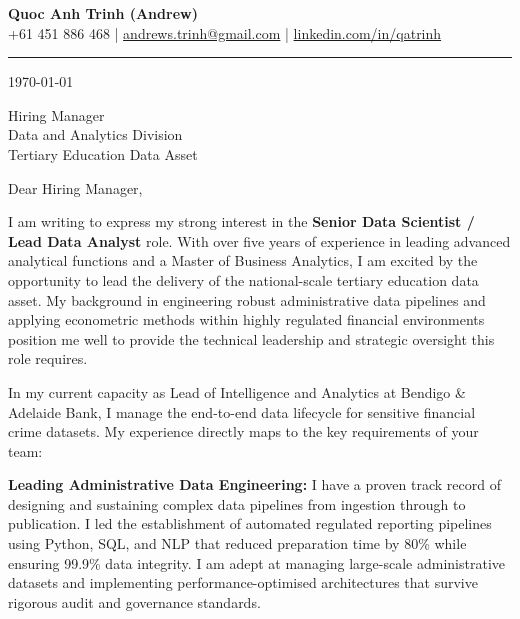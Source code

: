 \documentclass[11pt, a4paper]{article}
\begin{document}
\begin{center}
    {\LARGE \textbf{Quoc Anh Trinh (Andrew)}}\\[4pt]
    {\small
        +61 451 886 468 \quad|\quad
        \href{mailto:andrews.trinh@gmail.com}{andrews.trinh@gmail.com} \quad|\quad
        \href{https://www.linkedin.com/in/qatrinh}{linkedin.com/in/qatrinh}
    }
\end{center}

\vspace{4pt}
\hrule
\vspace{14pt}

\today

\vspace{8pt}

Hiring Manager\\
Data and Analytics Division\\
Tertiary Education Data Asset

\vspace{10pt}

Dear Hiring Manager,

I am writing to express my strong interest in the \textbf{Senior Data Scientist / Lead Data Analyst} role. With over five years of experience in leading advanced analytical functions and a Master of Business Analytics, I am excited by the opportunity to lead the delivery of the national-scale tertiary education data asset. My background in engineering robust administrative data pipelines and applying econometric methods within highly regulated financial environments position me well to provide the technical leadership and strategic oversight this role requires.

In my current capacity as Lead of Intelligence and Analytics at Bendigo \& Adelaide Bank, I manage the end-to-end data lifecycle for sensitive financial crime datasets. My experience directly maps to the key requirements of your team:

\textbf{Leading Administrative Data Engineering:}
I have a proven track record of designing and sustaining complex data pipelines from ingestion through to publication. I led the establishment of automated regulated reporting pipelines using Python, SQL, and NLP that reduced preparation time by 80\% while ensuring 99.9\% data integrity. I am adept at managing large-scale administrative datasets and implementing performance-optimised architectures that survive rigorous audit and governance standards.
\end{document}
